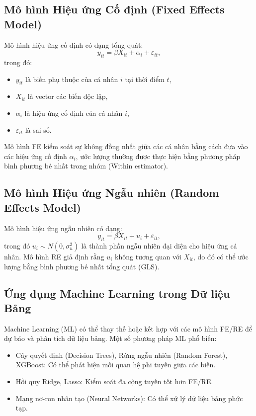 \subsection{Mô hình Hiệu ứng Cố định (Fixed Effects Model)}
Mô hình hiệu ứng cố định có dạng tổng quát:
\begin{equation}
    y_{it} = \beta X_{it} + \alpha_i + \varepsilon_{it},
\end{equation}
trong đó:
\begin{itemize}
    \item $y_{it}$ là biến phụ thuộc của cá nhân $i$ tại thời điểm $t$,
    \item $X_{it}$ là vector các biến độc lập,
    \item $\alpha_i$ là hiệu ứng cố định của cá nhân $i$,
    \item $\varepsilon_{it}$ là sai số.
\end{itemize}
Mô hình FE kiểm soát sự không đồng nhất giữa các cá nhân bằng cách đưa vào các hiệu ứng cố định $\alpha_i$, ước lượng thường được thực hiện bằng phương pháp bình phương bé nhất trong nhóm (Within estimator).

\subsection{Mô hình Hiệu ứng Ngẫu nhiên (Random Effects Model)}
Mô hình hiệu ứng ngẫu nhiên có dạng:
\begin{equation}
    y_{it} = \beta X_{it} + u_i + \varepsilon_{it},
\end{equation}
trong đó $u_i \sim N(0, \sigma_u^2)$ là thành phần ngẫu nhiên đại diện cho hiệu ứng cá nhân. Mô hình RE giả định rằng $u_i$ không tương quan với $X_{it}$, do đó có thể ước lượng bằng bình phương bé nhất tổng quát (GLS).

\subsection{Ứng dụng Machine Learning trong Dữ liệu Bảng}
Machine Learning (ML) có thể thay thế hoặc kết hợp với các mô hình FE/RE để dự báo và phân tích dữ liệu bảng. Một số phương pháp ML phổ biến:
\begin{itemize}
    \item Cây quyết định (Decision Trees), Rừng ngẫu nhiên (Random Forest), XGBoost: Có thể phát hiện mối quan hệ phi tuyến giữa các biến.
    \item Hồi quy Ridge, Lasso: Kiểm soát đa cộng tuyến tốt hơn FE/RE.
    \item Mạng nơ-ron nhân tạo (Neural Networks): Có thể xử lý dữ liệu bảng phức tạp.
\end{itemize}


